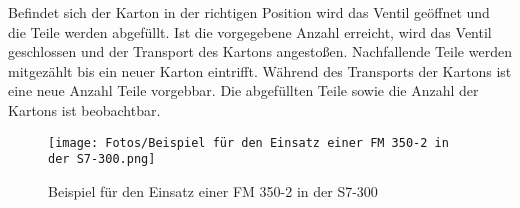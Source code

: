 Befindet sich der Karton in der richtigen Position wird das Ventil geöffnet und die Teile werden abgefüllt. Ist die vorgegebene Anzahl erreicht, wird das Ventil geschlossen und der Transport des Kartons angestoßen. Nachfallende Teile werden mitgezählt bis ein neuer Karton eintrifft.
Während des Transports der Kartons ist eine neue Anzahl Teile vorgebbar. Die abgefüllten Teile sowie die Anzahl der Kartons ist beobachtbar. 

\begin{figure}[h!] %
    \texttt{[image: Fotos/Beispiel für den Einsatz einer FM 350-2 in der S7-300.png]} 
    \caption{Beispiel für den Einsatz einer FM 350-2 in der S7-300\cite{fm350_Handbuch}} 
    \label{fig:Beispiel für den Einsatz einer FM 350-2 in der S7-300} %
    \vspace{0.5em} %
    \small %
\end{figure}